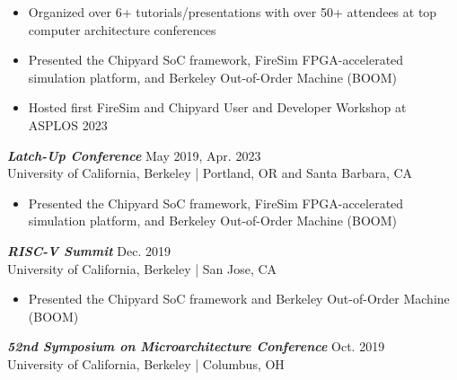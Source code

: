 \documentclass[letter]{res}
\begin{document}
\begin{resume}
 \vspace{-4mm}

 \begin{itemize}
 \item Organized over 6+ tutorials/presentations with over 50+ attendees at top computer architecture conferences
 \item Presented the Chipyard SoC framework, FireSim FPGA-accelerated simulation platform, and \newline Berkeley Out-of-Order Machine (BOOM)
 \item Hosted first FireSim and Chipyard User and Developer Workshop at ASPLOS 2023
 \end{itemize}

\vspace{-2mm}

{\sl \textbf{Latch-Up Conference}} \hfill May 2019, Apr. 2023 \\
 University of California, Berkeley | Portland, OR and Santa Barbara, CA \newline

 \vspace{-4mm}

 \begin{itemize}
 \item Presented the Chipyard SoC framework, FireSim FPGA-accelerated simulation platform, and \newline Berkeley Out-of-Order Machine (BOOM)
 \end{itemize}

\vspace{-2mm}

{\sl \textbf{RISC-V Summit}} \hfill Dec. 2019\\
 University of California, Berkeley | San Jose, CA \newline

 \vspace{-4mm}

 \begin{itemize}
 \item Presented the Chipyard SoC framework and Berkeley Out-of-Order Machine (BOOM)
 \end{itemize}

\vspace{-2mm}

{\sl \textbf{52nd Symposium on Microarchitecture Conference}} \hfill Oct. 2019\\
 University of California, Berkeley | Columbus, OH \newline


\end{resume}
\end{document}
